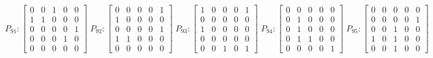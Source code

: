    $$
        P_{91} : \begin{bmatrix}
            0 & 0 & 1 & 0 & 0 \\
            1 & 1 & 0 & 0 & 0 \\
            0 & 0 & 0 & 0 & 1 \\
            0 & 0 & 0 & 1 & 0 \\
            0 & 0 & 0 & 0 & 0
        \end{bmatrix}
        \;
         P_{92} : \begin{bmatrix}
            0 & 0 & 0 & 0 & 1 \\
            1 & 0 & 0 & 0 & 0 \\
            0 & 0 & 0 & 0 & 1 \\
            1 & 1 & 0 & 0 & 0 \\
            0 & 0 & 0 & 0 & 0
        \end{bmatrix}
        \;
        P_{93} : \begin{bmatrix}
            1 & 0 & 0 & 0 & 1 \\
            0 & 0 & 0 & 0 & 0 \\
            1 & 0 & 0 & 0 & 0 \\
            0 & 0 & 0 & 0 & 0 \\
            0 & 0 & 1 & 0 & 1
        \end{bmatrix}
        \;
        P_{94} : \begin{bmatrix}
            0 & 0 & 0 & 0 & 0 \\
            0 & 1 & 0 & 0 & 0 \\
            0 & 1 & 0 & 0 & 0 \\
            0 & 1 & 1 & 0 & 0 \\
            0 & 0 & 0 & 0 & 1
        \end{bmatrix}
        \;
        P_{95} : \begin{bmatrix}
            0 & 0 & 0 & 0 & 0 \\
            0 & 0 & 0 & 0 & 1 \\
            0 & 0 & 1 & 0 & 0 \\
            1 & 0 & 1 & 0 & 0 \\
            0 & 0 & 1 & 0 & 0
        \end{bmatrix}
    $$

